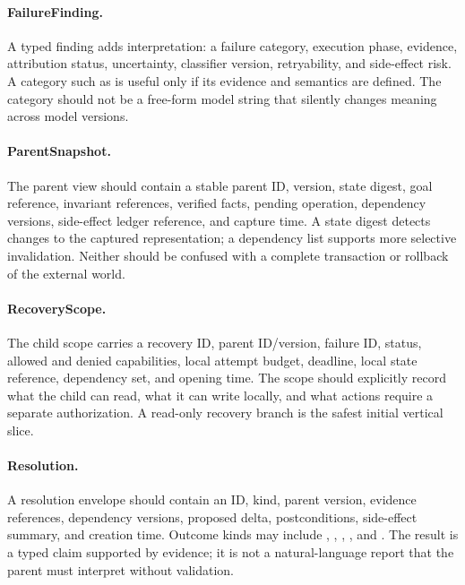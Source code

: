 \paragraph{FailureFinding.}

A typed finding adds interpretation: a failure category, execution phase, evidence, attribution status, uncertainty, classifier version, retryability, and side-effect risk. A category such as  is useful only if its evidence and semantics are defined. The category should not be a free-form model string that silently changes meaning across model versions.

\paragraph{ParentSnapshot.}

The parent view should contain a stable parent ID, version, state digest, goal reference, invariant references, verified facts, pending operation, dependency versions, side-effect ledger reference, and capture time. A state digest detects changes to the captured representation; a dependency list supports more selective invalidation. Neither should be confused with a complete transaction or rollback of the external world.

\paragraph{RecoveryScope.}

The child scope carries a recovery ID, parent ID/version, failure ID, status, allowed and denied capabilities, local attempt budget, deadline, local state reference, dependency set, and opening time. The scope should explicitly record what the child can read, what it can write locally, and what actions require a separate authorization. A read-only recovery branch is the safest initial vertical slice.

\paragraph{Resolution.}

A resolution envelope should contain an ID, kind, parent version, evidence references, dependency versions, proposed delta, postconditions, side-effect summary, and creation time. Outcome kinds may include , , , , and . The result is a typed claim supported by evidence; it is not a natural-language report that the parent must interpret without validation.

